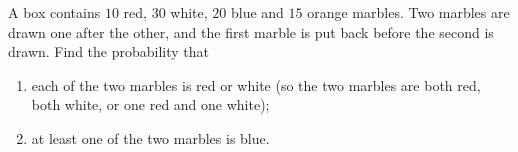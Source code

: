 A box contains $10$ red, $30$ white, $20$ blue and $15$ orange marbles. Two marbles are drawn one after the other, and the first marble is put back before the second is drawn. Find the probability that
\begin{enumerate}
\item[(a)] each of the two marbles is red or white (so the two marbles are both red, both white, or one red and one white);
\item[(b)] at least one of the two marbles is blue.
\end{enumerate}
